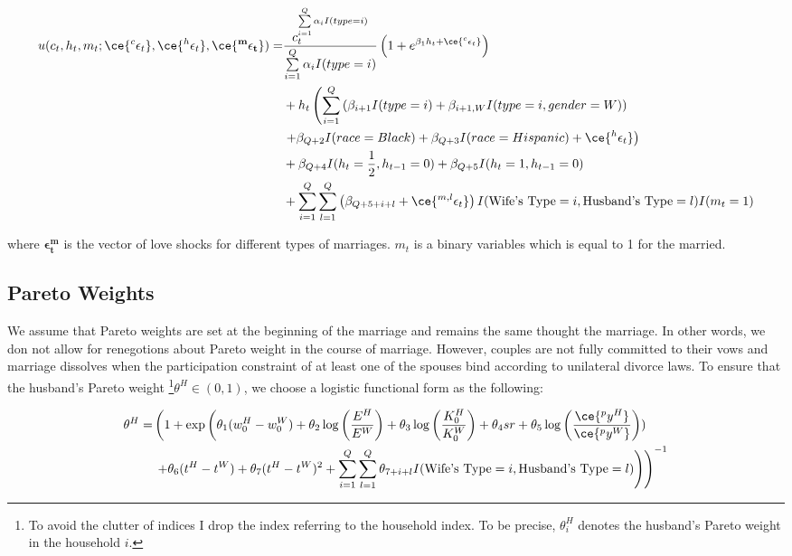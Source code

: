 \begin{align*}
 u(c_{t}, h_{t}, m_{t}; \ce{^{c}\epsilon_{t}}, \ce{^{h}\epsilon_t}, \ce{^{\mathbf{m}}\mathbf{\epsilon_t}}) = & \dfrac{c_t^{\sum \limits_ {i=1}^{Q} \alpha_iI(type = i)}}{{\sum \limits_ {i=1}^{Q} \alpha_iI(type = i)}} \left (1 + e^{\beta_1 h_t+\ce{^c\epsilon_t}} \right ) \\
& + h_t \left( \sum \limits_{i=1}^{Q} \left( \beta_{i+1} I(type =i) + \beta_{i+1,W}  I(type = i, gender = W)\right) \right. \\
& \left.  + \beta_{Q+2} I(race = Black) + \beta_{Q+3} I(race = Hispanic) +\ce{^h\epsilon_t}  \right) \\
& + \beta_{Q+4} I(h_t =\frac{1}{2}, h_{t-1} = 0) + \beta_{Q+5} I(h_t = 1, h_{t-1} = 0) \\
& + \sum \limits_{i=1}^{Q} \sum \limits_{l=1}^{Q} \left( \beta_{Q+5+i+l} + \ce{^{m,l}\epsilon_t}\right ) I(\text{Wife's Type} = i, \text{Husband's Type} = l) I(m_t = 1)
\end{align*}


where $\mathbf {\epsilon_t^m}$ is the vector of love shocks for different types of marriages. $m_t$ is a binary variables which is equal to 1 for the married. 

\subsection{Pareto Weights}

 We assume that Pareto weights are set at the beginning of the marriage and remains the same thought the marriage. In other words, we don not allow for renegotions about Pareto weight in the course of marriage. However, couples are not fully committed to their vows and marriage dissolves when the participation constraint of at least one of the spouses bind according to unilateral divorce laws. To ensure that the husband's Pareto weight \footnote {To avoid the clutter of indices I drop the index referring to the household index. To be precise, $\theta_i^H$ denotes the husband's Pareto weight in the household $i$.}$\theta^H \in (0,1)$, we choose a logistic functional form as the following: 

\begin{align*}
\theta^H = & \left ( 1 + \exp \left( \theta_1 (w^H_{0} - w^W_{0}) + \theta_2 \log \left( \dfrac{E^H}{E^W} \right) + \theta_3 \log \left ( \dfrac{K^H_{0}}{K^W_{0}}\right ) + \theta_4 sr +\theta_5 \log \left ( \dfrac{\ce{^p y^H}}{\ce{^p y^W}}\right ) )\right. \right. \\
& \left. \left. + \theta_6 (t^H - t^W) + \theta_7 (t^H - t^W)^2 +  \sum \limits_{i=1}^{Q} \sum \limits_{l=1}^{Q} \theta_{7+i+l} I(\text{Wife's Type} = i, \text{Husband's Type} = l)   \right )\right )^{-1}
\end{align*}

